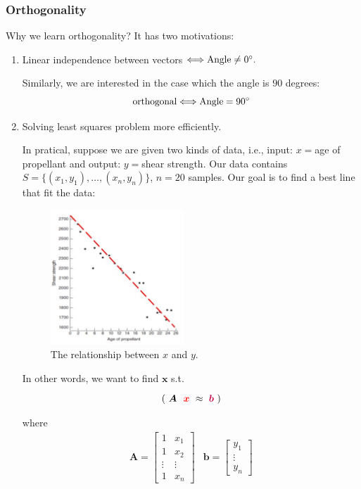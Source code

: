 \subsubsection{Orthogonality}
Why we learn orthogonality? It has two motivations:
\begin{enumerate}
\item
Linear independence between vectors
$\Longleftrightarrow\text{Angle}\ne0^\circ.$

Similarly, we are interested in the case which the angle is $90$ degrees:
\[
\mbox{orthogonal}\Longleftrightarrow
\mbox{Angle}=90^\circ
\]
\item
Solving least squares problem more efficiently.

In pratical, suppose we are given two kinds of data, i.e., 
input: $x =$age of propellant and output: $y = $shear strength. Our data contains $S=\{(x_1,y_1),\dots,(x_{n},y_{n})\}$, $n=20$ samples. Our goal is to find a best line that fit the data:
\begin{figure}[H]
\centering
\includegraphics[width=5cm]{week6/regression}
\caption{The relationship between $x$ and $y$.}
\end{figure}
In other words, we want to find $\bm x$ s.t.
\[
    (\tikzmark{identity}{$\bm A$}\tikzmark[red]{G}{$\bm x$}
    \approx\tikzmark[purple]{C}{$\bm b$})
\]

where 
\[
\begin{array}{ll}
\bm A=\begin{bmatrix}
1&x_1\\
1&x_2\\
\vdots&\vdots\\
1&x_{n}
\end{bmatrix}
&
\bm b=\begin{bmatrix}
y_1\\\vdots\\y_n
\end{bmatrix}
\end{array}
\]


\end{enumerate}

